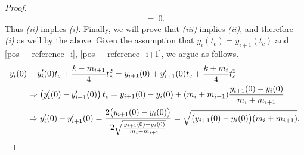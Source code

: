 \documentclass[10pt,a4paper]{amsart}
\begin{document}
\begin{proof}
\begin{align*}
                = \ 0.
            \end{align*}
            Thus \emph{(ii)} implies \emph{(i)}. Finally, we will prove that \emph{(iii)} implies \emph{(ii)}, and therefore \emph{(i)} as well by the above. Given the assumption that $y_i(t_c) = y_{i+1}(t_c)$ and \eqref{pos__reference_i}, \eqref{pos__reference_i+1}, we argue as follows.
            \begin{align*}
                y_i(0)& + y_i'(0)t_c + \frac{k - m_{i+1}}{4} t_c^2 = y_{i+1}(0) + y_{i+1}'(0) t_c + \frac{k + m_{i}}{4} t_c^2 
                \\ 
                &\Rightarrow \left (y_i'(0) - y_{i+1}'(0) \right) t_c = y_{i+1}(0) - y_i(0) + (m_i + m_{i+1}) \frac{y_{i+1}(0)-y_i(0)}{m_i+m_{i+1}} \\
                &\Rightarrow y_i'(0) - y_{i+1}'(0) = \frac{2\big(y_{i+1}(0) - y_i(0)\big)}{2\sqrt{\frac{y_{i+1}(0)-y_i(0)}{m_i+m_{i+1}}}} 
                =\sqrt{\big(y_{i+1}(0)-y_i(0)\big)(m_i+m_{i+1})}. \qedhere
            \end{align*}
        \end{proof}
\end{document}
